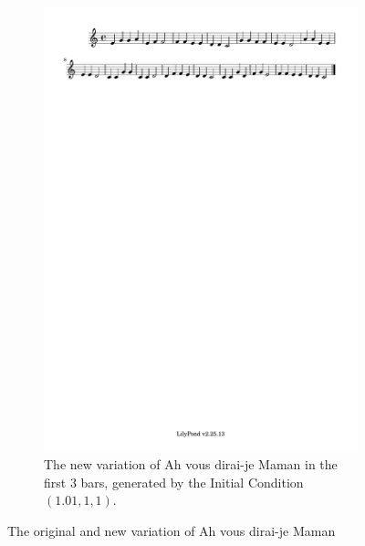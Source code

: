 \documentclass[11pt]{article}
\theoremstyle{definition}
\begin{document}
\begin{figure}
\begin{subfigure}{\textwidth}
  \includegraphics[trim=1cm 26.5cm 10.0325cm 0.02cm, clip, scale=0.8]{dabby_2.pdf}
  \caption{The new variation of Ah vous dirai-je Maman in the first 3 bars, generated by the Initial Condition $(1.01, 1, 1)$.}
  \label{fig:Dabby2}
\end{subfigure}
\caption{The original and new variation of Ah vous dirai-je Maman}
\end{figure}
\end{document}
